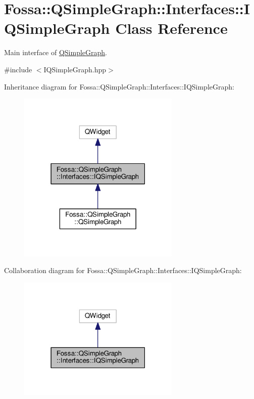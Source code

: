 \hypertarget{class_fossa_1_1_q_simple_graph_1_1_interfaces_1_1_i_q_simple_graph}{}\section{Fossa\+:\+:Q\+Simple\+Graph\+:\+:Interfaces\+:\+:I\+Q\+Simple\+Graph Class Reference}
\label{class_fossa_1_1_q_simple_graph_1_1_interfaces_1_1_i_q_simple_graph}


Main interface of \hyperlink{class_fossa_1_1_q_simple_graph_1_1_q_simple_graph}{Q\+Simple\+Graph}.  




{\ttfamily \#include $<$I\+Q\+Simple\+Graph.\+hpp$>$}



Inheritance diagram for Fossa\+:\+:Q\+Simple\+Graph\+:\+:Interfaces\+:\+:I\+Q\+Simple\+Graph\+:\nopagebreak
\begin{figure}[H]
\begin{center}
\leavevmode
\includegraphics[width=219pt]{class_fossa_1_1_q_simple_graph_1_1_interfaces_1_1_i_q_simple_graph__inherit__graph}
\end{center}
\end{figure}


Collaboration diagram for Fossa\+:\+:Q\+Simple\+Graph\+:\+:Interfaces\+:\+:I\+Q\+Simple\+Graph\+:\nopagebreak
\begin{figure}[H]
\begin{center}
\leavevmode
\includegraphics[width=219pt]{class_fossa_1_1_q_simple_graph_1_1_interfaces_1_1_i_q_simple_graph__coll__graph}
\end{center}
\end{figure}

